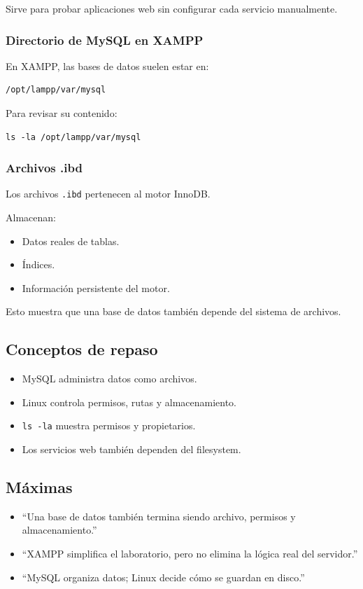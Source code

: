 \documentclass[11pt, letterpaper]{article}
\begin{document}
Sirve para probar aplicaciones web sin configurar cada servicio manualmente.
\subsubsection{Directorio de MySQL en XAMPP}
\label{sec:orga43d648}

En XAMPP, las bases de datos suelen estar en:

\begin{verbatim}
/opt/lampp/var/mysql
\end{verbatim}

Para revisar su contenido:

\begin{verbatim}
ls -la /opt/lampp/var/mysql
\end{verbatim}
\subsubsection{Archivos .ibd}
\label{sec:orgb20b496}

Los archivos \texttt{.ibd} pertenecen al motor InnoDB.

Almacenan:
\begin{itemize}
\item Datos reales de tablas.
\item Índices.
\item Información persistente del motor.
\end{itemize}

Esto muestra que una base de datos también depende del sistema de archivos.
\subsection{Conceptos de repaso}
\label{sec:orgd394e45}

\begin{itemize}
\item MySQL administra datos como archivos.
\item Linux controla permisos, rutas y almacenamiento.
\item \texttt{ls -la} muestra permisos y propietarios.
\item Los servicios web también dependen del filesystem.
\end{itemize}
\subsection{Máximas}
\label{sec:orgd6045d8}

\begin{itemize}
\item “Una base de datos también termina siendo archivo, permisos y almacenamiento.”
\item “XAMPP simplifica el laboratorio, pero no elimina la lógica real del servidor.”
\item “MySQL organiza datos; Linux decide cómo se guardan en disco.”
\end{itemize}
\end{document}
